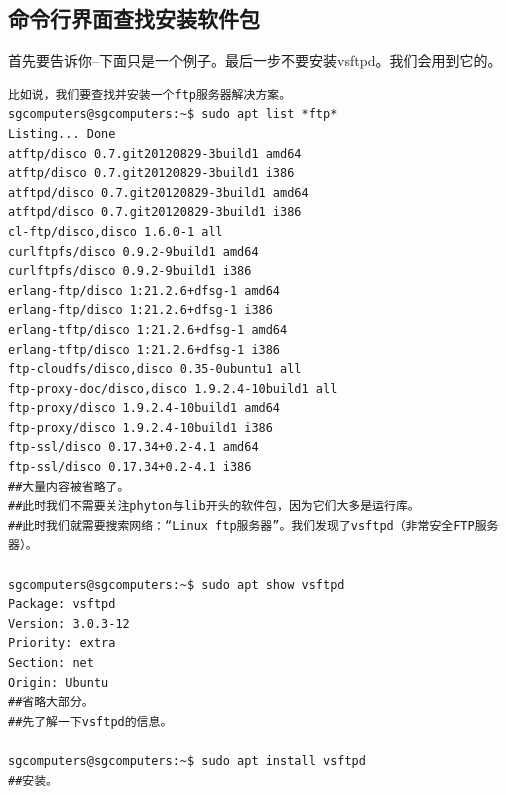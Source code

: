 \subsection{命令行界面查找安装软件包}
首先要告诉你--下面只是一个例子。最后一步不要安装vsftpd。我们会用到它的。
\begin{verbatim}
比如说，我们要查找并安装一个ftp服务器解决方案。
sgcomputers@sgcomputers:~$ sudo apt list *ftp*
Listing... Done
atftp/disco 0.7.git20120829-3build1 amd64
atftp/disco 0.7.git20120829-3build1 i386
atftpd/disco 0.7.git20120829-3build1 amd64
atftpd/disco 0.7.git20120829-3build1 i386
cl-ftp/disco,disco 1.6.0-1 all
curlftpfs/disco 0.9.2-9build1 amd64
curlftpfs/disco 0.9.2-9build1 i386
erlang-ftp/disco 1:21.2.6+dfsg-1 amd64
erlang-ftp/disco 1:21.2.6+dfsg-1 i386
erlang-tftp/disco 1:21.2.6+dfsg-1 amd64
erlang-tftp/disco 1:21.2.6+dfsg-1 i386
ftp-cloudfs/disco,disco 0.35-0ubuntu1 all
ftp-proxy-doc/disco,disco 1.9.2.4-10build1 all
ftp-proxy/disco 1.9.2.4-10build1 amd64
ftp-proxy/disco 1.9.2.4-10build1 i386
ftp-ssl/disco 0.17.34+0.2-4.1 amd64
ftp-ssl/disco 0.17.34+0.2-4.1 i386
##大量内容被省略了。
##此时我们不需要关注phyton与lib开头的软件包，因为它们大多是运行库。
##此时我们就需要搜索网络：“Linux ftp服务器”。我们发现了vsftpd（非常安全FTP服务器）。

sgcomputers@sgcomputers:~$ sudo apt show vsftpd
Package: vsftpd
Version: 3.0.3-12
Priority: extra
Section: net
Origin: Ubuntu
##省略大部分。
##先了解一下vsftpd的信息。

sgcomputers@sgcomputers:~$ sudo apt install vsftpd
##安装。
\end{verbatim}
